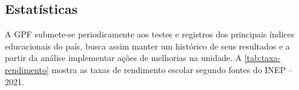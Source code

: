 \subsection{Estatísticas} %
\label{sub:Estatísticas}
\setlength\intextsep{0pt}
\begin{table}
	\centering
	\caption{Taxa de rendimento escolar por etapa.}
	\label{tab:taxa-rendimento}
\end{table}
A \ac{GPF} submete-se periodicamente aos testes e registros dos principais índices educacionais do país, busca assim manter um histórico de seus resultados e a partir da análise implementar ações de melhorias na unidade. A \autoref{tab:taxa-rendimento} mostra as taxas de rendimento escolar segundo fontes do \ac{INEP} -- 2021.

